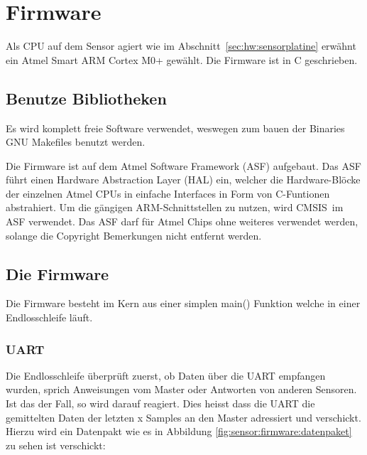 \section{Firmware \Sensor}
\label{sec:firmware:sensor}

Als  CPU auf  dem  Sensor agiert  wie im  Abschnitt~\ref{sec:hw:sensorplatine}
erw\"ahnt ein  Atmel Smart ARM  Cortex M0+ gew\"ahlt.   Die Firmware ist  in C
geschrieben.

\subsection{Benutze Bibliotheken}

Es wird komplett freie Software verwendet, weswegen zum bauen der Binaries GNU
Makefiles benutzt werden.

Die  Firmware  ist  auf  dem Atmel  Software  Framework  (ASF)  aufgebaut. Das
ASF  f\"uhrt  einen   Hardware  Abstraction  Layer  (HAL)   ein,  welcher  die
Hardware-Bl\"ocke der einzelnen Atmel CPUs  in einfache Interfaces in Form von
C-Funtionen abstrahiert. Um die g\"angigen  ARM-Schnittstellen zu nutzen, wird
CMSIS im  ASF  verwendet. Das  ASF  darf  f\"ur  Atmel  Chips  ohne  weiteres
verwendet werden, solange die Copyright Bemerkungen nicht entfernt werden.

\subsection{Die Firmware}

Die Firmware besteht im Kern aus einer simplen main() Funktion welche in einer
Endlosschleife l\"auft.

\subsubsection{UART}
\label{subs:UART}

Die Endlosschleife  \"uberpr\"uft zuerst, ob Daten  \"uber die  UART empfangen
wurden,   sprich   Anweisungen  vom   Master   oder   Antworten  von   anderen
Sensoren. Ist  das  der  Fall,  so  wird  darauf  reagiert. Dies  heisst  dass
die  UART  die  gemittelten  Daten  der   letzten  x  Samples  an  den  Master
adressiert  und verschickt.   Hierzu wird  ein Datenpakt  wie es  in Abbildung
\ref{fig:sensor:firmware:datenpaket} zu sehen ist verschickt:

